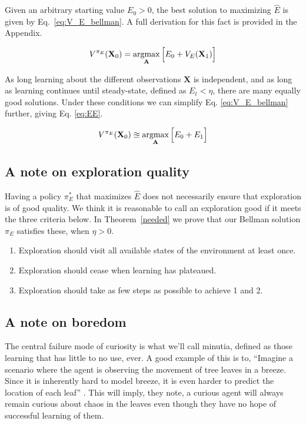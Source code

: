 Given an arbitrary starting value $E_0 > 0$, the best solution to maximizing $\hat E$ is given by Eq.~\ref{eq:V_E_bellman}. A full derivation for this fact is provided in the Appendix. 

\begin{equation}
	\label{eq:V_E_bellman} 
	V^{\pi_{E}}(\mathbf{X}_0) = \operatorname*{argmax}_{\mathbf{A}} \Big [ E_0 + V_E(\mathbf{X}_1) \Big ]
\end{equation}

As long learning about the different observations $\mathbf{X}$ is independent, and as long as learning continues until steady-state, defined as $E_t < \eta$, there are many equally good solutions. Under these conditions we can simplify Eq. \ref{eq:V_E_bellman} further, giving Eq. \ref{eq:EE}. 

\begin{equation}
	\label{eq:EE} 
	V^{\pi_{E}}(\mathbf{X}_0)  \approxeq \operatorname*{argmax}_{\mathbf{A}} \Big [ E_0 + E_1 \Big ]
\end{equation}

\subsection{A note on exploration quality}
Having a policy $\pi_E^*$ that maximizes $\hat E$ does not necessarily ensure that exploration is of good quality. We think it is reasonable to call an exploration good if it meets the three criteria below. In Theorem~\ref{needed} we prove that our Bellman solution $\pi_E$ satisfies these, when $\eta > 0$.


\begin{enumerate}
	\item Exploration should visit all available states of the environment at least once.
	\item Exploration should cease when learning has plateaued.
	\item Exploration should take as few steps as possible to achieve 1 and 2.
\end{enumerate}


\subsection{A note on boredom}
The central failure mode of curiosity is what we'll call minutia, defined as those learning that has little to no use, ever. A good example of this is to, ``Imagine a scenario where the agent is observing the movement of tree leaves in a breeze. Since it is inherently hard to model breeze, it is even harder to predict the location of each leaf'' \cite{Pathak2017}. This will imply, they note, a curious agent will always remain curious about chaos in the leaves even though they have no hope of successful learning of them.

